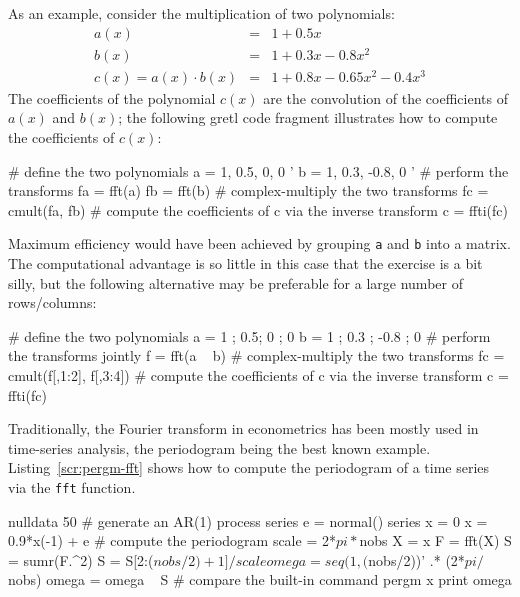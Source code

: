 As an example, consider the multiplication of two polynomials:
\begin{eqnarray*}
  a(x) & = & 1 + 0.5 x \\
  b(x) & = & 1 + 0.3 x - 0.8 x^2 \\
  c(x) = a(x) \cdot b(x) & = & 1 + 0.8 x - 0.65 x^2 - 0.4 x^3
\end{eqnarray*}
The coefficients of the polynomial $c(x)$ are the convolution of the
coefficients of $a(x)$ and $b(x)$; the following gretl code fragment
illustrates how to compute the coefficients of $c(x)$:
\begin{code}
# define the two polynomials
a = { 1, 0.5, 0, 0 }'
b = { 1, 0.3, -0.8, 0 }'
# perform the transforms
fa = fft(a)
fb = fft(b)
# complex-multiply the two transforms
fc = cmult(fa, fb)
# compute the coefficients of c via the inverse transform
c = ffti(fc)
\end{code}

Maximum efficiency would have been achieved by grouping \texttt{a} and
\texttt{b} into a matrix.  The computational advantage is so little in
this case that the exercise is a bit silly, but the following
alternative may be preferable for a large number of
rows/columns:
\begin{code}
# define the two polynomials
a = { 1 ; 0.5; 0 ; 0 }
b = { 1 ; 0.3 ; -0.8 ; 0 }
# perform the transforms jointly
f = fft(a ~ b)
# complex-multiply the two transforms
fc = cmult(f[,1:2], f[,3:4])
# compute the coefficients of c via the inverse transform
c = ffti(fc)
\end{code}

Traditionally, the Fourier transform in econometrics has been mostly
used in time-series analysis, the periodogram being the best known
example. Listing~\ref{scr:pergm-fft} shows how to compute the
periodogram of a time series via the \texttt{fft} function.

\begin{script}[htbp]
  \label{scr:pergm-fft}
\begin{scode}
nulldata 50
# generate an AR(1) process
series e = normal()
series x = 0
x = 0.9*x(-1) + e
# compute the periodogram
scale = 2*$pi*$nobs
X = {x}
F = fft(X)
S = sumr(F.^2)
S = S[2:($nobs/2)+1]/scale
omega = seq(1,($nobs/2))' .* (2*$pi/$nobs)
omega = omega ~ S
# compare the built-in command
pergm x
print omega
\end{scode}
\end{script}

